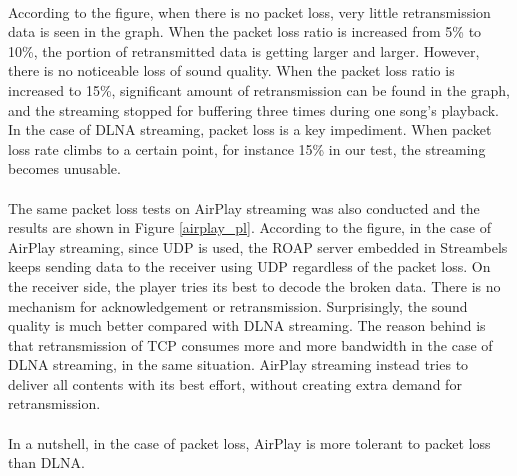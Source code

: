 \\
According to the figure, when there is no packet loss, very little retransmission data is seen in the graph. When the packet loss ratio is increased from 5\% to 10\%, the portion of retransmitted data is getting larger and larger. However, there is no noticeable loss of sound quality. When the packet loss ratio is increased to 15\%, significant amount of retransmission can be found in the graph, and the streaming stopped for buffering three times during one song's playback. In the case of DLNA streaming, packet loss is a key impediment. When packet loss rate climbs to a certain point, for instance 15\% in our test, the streaming becomes unusable.\\
\\
The same packet loss tests on AirPlay streaming was also conducted and the results are shown in Figure \ref{airplay_pl}. According to the figure, in the case of AirPlay streaming, since UDP is used, the ROAP server embedded in Streambels keeps sending data to the receiver using UDP regardless of  the packet loss. On the receiver side, the player tries its best to decode the broken data. There is no mechanism for acknowledgement or retransmission. Surprisingly, the sound quality is much better compared with DLNA streaming. The reason behind is that retransmission of TCP consumes more and more bandwidth in the case of DLNA streaming, in the same situation. AirPlay streaming instead tries to deliver all contents with its best effort, without creating extra demand for retransmission.\\
\\
In a nutshell, in the case of packet loss, AirPlay is more tolerant to packet loss than DLNA.
